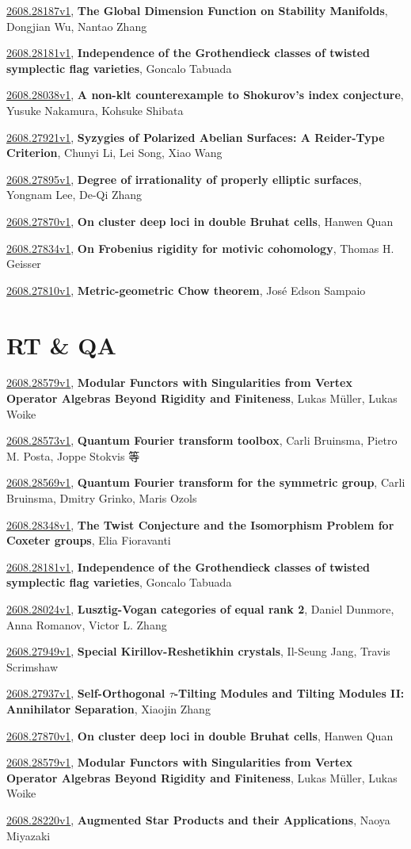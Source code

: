 \documentclass[9pt, a4paper]{article}
\theoremstyle{plain}
\theoremstyle{definition}
\theoremstyle{remark}
\newcommand{\arxiv}[3]{\href{https://arxiv.org/abs/#1}{#1}, \textbf{\textcolor{arxivblue}{#2}}, #3}
\begin{document}
\arxiv{2608.28187v1}{The Global Dimension Function on Stability Manifolds}{Dongjian Wu, Nantao Zhang}

\arxiv{2608.28181v1}{Independence of the Grothendieck classes of twisted symplectic flag varieties}{Goncalo Tabuada}

\arxiv{2608.28038v1}{A non-klt counterexample to Shokurov's index conjecture}{Yusuke Nakamura, Kohsuke Shibata}

\arxiv{2608.27921v1}{Syzygies of Polarized Abelian Surfaces: A Reider-Type Criterion}{Chunyi Li, Lei Song, Xiao Wang}

\arxiv{2608.27895v1}{Degree of irrationality of properly elliptic surfaces}{Yongnam Lee, De-Qi Zhang}

\arxiv{2608.27870v1}{On cluster deep loci in double Bruhat cells}{Hanwen Quan}

\arxiv{2608.27834v1}{On Frobenius rigidity for motivic cohomology}{Thomas H. Geisser}

\arxiv{2608.27810v1}{Metric-geometric Chow theorem}{José Edson Sampaio}


\section{RT \& QA}
\arxiv{2608.28579v1}{Modular Functors with Singularities from Vertex Operator Algebras Beyond Rigidity and Finiteness}{Lukas Müller, Lukas Woike}

\arxiv{2608.28573v1}{Quantum Fourier transform toolbox}{Carli Bruinsma, Pietro M. Posta, Joppe Stokvis 等}

\arxiv{2608.28569v1}{Quantum Fourier transform for the symmetric group}{Carli Bruinsma, Dmitry Grinko, Maris Ozols}

\arxiv{2608.28348v1}{The Twist Conjecture and the Isomorphism Problem for Coxeter groups}{Elia Fioravanti}

\arxiv{2608.28181v1}{Independence of the Grothendieck classes of twisted symplectic flag varieties}{Goncalo Tabuada}

\arxiv{2608.28024v1}{Lusztig-Vogan categories of equal rank 2}{Daniel Dunmore, Anna Romanov, Victor L. Zhang}

\arxiv{2608.27949v1}{Special Kirillov-Reshetikhin crystals}{Il-Seung Jang, Travis Scrimshaw}

\arxiv{2608.27937v1}{Self-Orthogonal $τ$-Tilting Modules and Tilting Modules II: Annihilator Separation}{Xiaojin Zhang}

\arxiv{2608.27870v1}{On cluster deep loci in double Bruhat cells}{Hanwen Quan}

\arxiv{2608.28579v1}{Modular Functors with Singularities from Vertex Operator Algebras Beyond Rigidity and Finiteness}{Lukas Müller, Lukas Woike}

\arxiv{2608.28220v1}{Augmented Star Products and their Applications}{Naoya Miyazaki}

\end{document}
